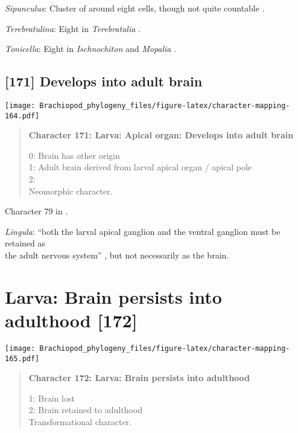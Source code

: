 \documentclass[openany]{book}
\theoremstyle{definition}
\theoremstyle{definition}
\theoremstyle{definition}
\theoremstyle{remark}
\begin{document}
\hypertarget{Sipunculus-coding-170}{}
\emph{Sipunculus}: Cluster of around eight cells, though not quite
countable \citep{Wanninger2005}.

\hypertarget{Terebratulina-coding-170}{}
\emph{Terebratulina}: Eight in \emph{Terebratalia} \citep{Luter2016}.

\hypertarget{Tonicella-coding-170}{}
\emph{Tonicella}: Eight in \emph{Ischnochiton} and \emph{Mopalia}
\citep{Wanninger2007}.

\subsection*{{[}171{]} Develops into adult
brain}\label{develops-into-adult-brain}

\texttt{[image: Brachiopod\_phylogeny\_files/figure-latex/character-mapping-164.pdf]}

\begin{quote}
\textbf{Character 171: Larva: Apical organ: Develops into adult brain}

0: Brain has other origin\\
1: Adult brain derived from larval apical organ / apical pole\\
2:\\
Neomorphic character.
\end{quote}

Character 79 in \citet{Glenner2004}.

\hypertarget{Lingula-coding-171}{}
\emph{Lingula}: ``both the larval apical ganglion and the ventral
ganglion must be retained as\\
the adult nervous system'' \citep{HaySchmidt1992}, but not necessarily
as the brain.

\section{Larva: Brain persists into adulthood
{[}172{]}}\label{larva-brain-persists-into-adulthood-172}

\texttt{[image: Brachiopod\_phylogeny\_files/figure-latex/character-mapping-165.pdf]}

\begin{quote}
\textbf{Character 172: Larva: Brain persists into adulthood}

1: Brain lost\\
2: Brain retained to adulthood\\
Transformational character.
\end{quote}
\end{document}
